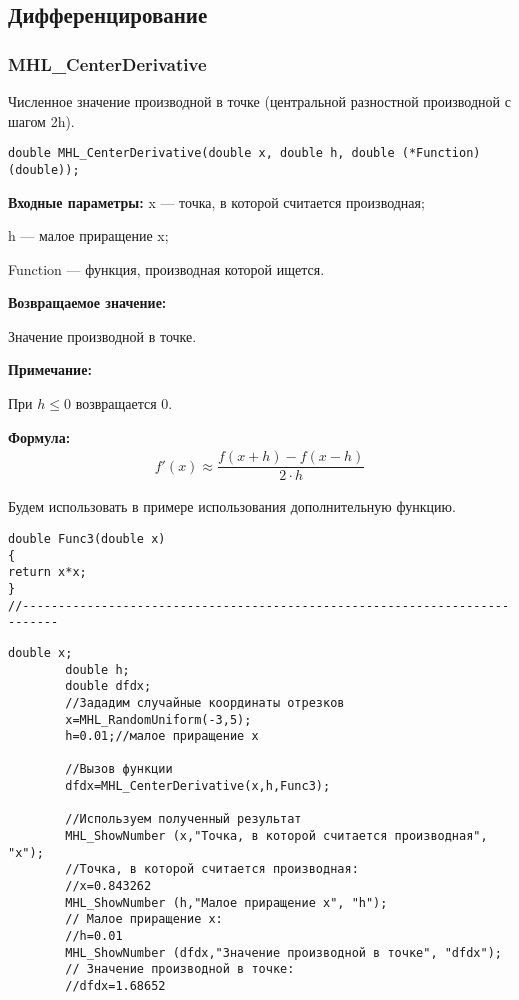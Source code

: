 \documentclass[a4paper,12pt]{article}
\begin{document}
\subsection{Дифференцирование}

\subsubsection{MHL\_CenterDerivative}\label{MHL_CenterDerivative}

Численное значение производной в точке (центральной разностной производной с шагом 2h).


\begin{lstlisting}[label=code_syntax_MHL_CenterDerivative,caption=Синтаксис]
double MHL_CenterDerivative(double x, double h, double (*Function)(double));
\end{lstlisting}

\textbf{Входные параметры:}
 x --- точка, в которой считается производная;
 
 h --- малое приращение x;
 
 Function --- функция, производная которой ищется.

\textbf{Возвращаемое значение:}
 
 Значение производной в точке.
 
 \textbf{Примечание:}
 
 При $h\leq0$ возвращается $0$.

\textbf{Формула:}
\begin{eqnarray*}
f'\left( x\right) \approx \dfrac{f\left( x+h\right)-f\left( x-h\right) }{2\cdot h}
\end{eqnarray*}

Будем использовать в примере использования дополнительную функцию.

\begin{lstlisting}[caption=Дополнительная функция]
double Func3(double x)
{
return x*x;
}
//---------------------------------------------------------------------------
\end{lstlisting}


\begin{lstlisting}[label=code_use_MHL_CenterDerivative,caption=Пример использования]
        double x;
        double h;
        double dfdx;
        //Зададим случайные координаты отрезков
        x=MHL_RandomUniform(-3,5);
        h=0.01;//малое приращение x

        //Вызов функции
        dfdx=MHL_CenterDerivative(x,h,Func3);

        //Используем полученный результат
        MHL_ShowNumber (x,"Точка, в которой считается производная", "x");
        //Точка, в которой считается производная:
        //x=0.843262
        MHL_ShowNumber (h,"Малое приращение x", "h");
        // Малое приращение x:
        //h=0.01
        MHL_ShowNumber (dfdx,"Значение производной в точке", "dfdx");
        // Значение производной в точке:
        //dfdx=1.68652
\end{lstlisting}
\end{document}
